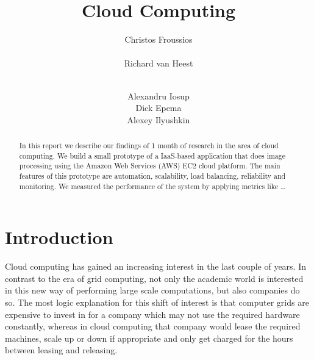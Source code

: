 \documentclass{stylesheet}
\begin{document}
\title{Cloud Computing}

\author{
\alignauthor
Christos Froussios\\
	\\
\alignauthor
Richard van Heest\\
	\\
\and
\alignauthor
Alexandru Iosup\\
\alignauthor
Dick Epema\\
\alignauthor
Alexey Ilyushkin\\
}

\maketitle

\begin{abstract}
In this report we describe our findings of 1 month of research in the area of cloud computing. We build a small prototype of a IaaS-based application that does image processing using the Amazon Web Services (AWS) EC2 cloud platform. The main features of this prototype are automation, scalability, load balancing, reliability and monitoring. We measured the performance of the system by applying metrics like \ldots
\end{abstract}

\section{Introduction}
Cloud computing has gained an increasing interest in the last couple of years. In contrast to the era of grid computing, not only the academic world is interested in this new way of performing large scale computations, but also companies do so. The most logic explanation for this shift of interest is that computer grids are expensive to invest in for a company which may not use the required hardware constantly, whereas in cloud computing that company would lease the required machines, scale up or down if appropriate and only get charged for the hours between leasing and releasing.
\end{document}
